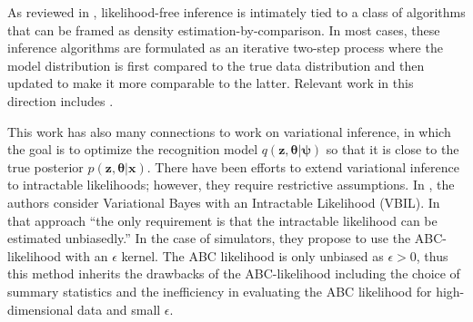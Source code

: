 \documentclass[twocolumn,superscriptaddress,aps]{revtex4-1}
\newcommand{\bftheta}{{\bm \theta}}
\newcommand{\bfpsi}{{\bm \psi}}
\newcommand{\bfx}{\mathbf{x}}
\newcommand{\bfz}{\mathbf{z}}
\theoremstyle{plain}
\begin{document}
As reviewed in \cite{2016arXiv161003483M}, likelihood-free inference is
intimately tied to a class of algorithms that can be framed as density
estimation-by-comparison. In most cases, these inference algorithms are
formulated as an iterative two-step process where the model distribution is
first compared to the true data distribution and then updated to make it more
comparable to the latter. Relevant work in this direction includes
\citep{gutmann2012noise,cranmer2015approximating,cranmer2016experiments,2016arXiv161110242D,gutmann2017likelihood,rosca2017variational}.





This work has also many connections to work on variational inference, in which the
goal is to optimize the recognition model $q(\bfz, \bftheta|\bfpsi)$ so that it
is close to the true posterior $p(\bfz, \bftheta |\mathbf{x})$. There have been efforts
to extend variational inference to intractable likelihoods; however, they
require restrictive assumptions.  In \citep{tran2017variational}, the authors
consider Variational Bayes with an Intractable Likelihood (VBIL). In that
approach ``the only requirement is that the intractable likelihood can be
estimated unbiasedly.'' In the case of simulators, they propose to use the
ABC-likelihood with an $\epsilon$ kernel. The ABC likelihood is only unbiased as
$\epsilon > 0$,   thus this method inherits the drawbacks of the ABC-likelihood
including the choice of summary statistics and the inefficiency in evaluating
the ABC likelihood for high-dimensional data and small $\epsilon$.
\end{document}
